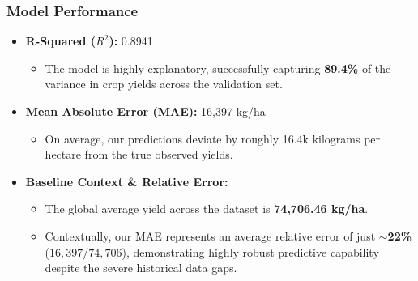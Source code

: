 \documentclass[aspectratio=169]{beamer}
\begin{document}
    \begin{frame}
        \frametitle{Model Performance}
        \begin{itemize}
            \item \textbf{R-Squared ($R^2$):} 0.8941
            \begin{itemize}
                \item The model is highly explanatory, successfully capturing \textbf{89.4\%} of the variance in crop yields across the validation set.
            \end{itemize}
            \vspace{0.3cm} %
            \item \textbf{Mean Absolute Error (MAE):} 16,397 kg/ha
            \begin{itemize}
                \item On average, our predictions deviate by roughly 16.4k kilograms per hectare from the true observed yields.
            \end{itemize}
            \vspace{0.3cm}
            \item \textbf{Baseline Context \& Relative Error:} 
            \begin{itemize}
                \item The global average yield across the dataset is \textbf{74,706.46 kg/ha}.
                \item Contextually, our MAE represents an average relative error of just \textbf{$\sim$22\%} ($16,397 / 74,706$), demonstrating highly robust predictive capability despite the severe historical data gaps.
            \end{itemize}
        \end{itemize}
    \end{frame}
\end{document}
